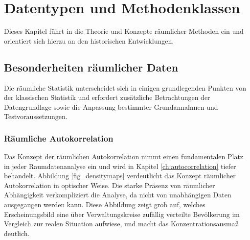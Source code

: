 \chapter{Datentypen und Methodenklassen}
\label{ch:classification}
Dieses Kapitel führt in die Theorie und Konzepte räumlicher Methoden ein und orientiert sich hierzu 
an den historischen Entwicklungen.



\section{Besonderheiten räumlicher Daten}

Die räumliche Statistik unterscheidet sich in einigen 
grundlegenden Punkten von der klassischen Statistik und erfordert zusätzliche 
Betrachtungen der Datengrundlage sowie die Anpassung bestimmter Grundannahmen und Testvoraussetzungen.


\subsection*{Räumliche Autokorrelation}
\label{subsec:tobler}

Das Konzept der räumlichen Autokorrelation nimmt einen fundamentalen Platz in jeder Raumdatenanalyse ein und wird in Kapitel \ref{ch:autocorrelation} tiefer behandelt.
Abbildung \ref{fig_densitymaps} verdeutlicht das Konzept räumlicher Autokorrelation in optischer Weise. 
Die starke Präsenz von räumlicher 
Abhängigkeit verkompliziert die Analyse, da nicht von unabhängigen Daten ausgegangen werden kann. 
Diese Abbildung zeigt grob auf, welches Erscheinungsbild eine über Verwaltungskreise zufällig verteilte Bevölkerung 
im Vergleich zur realen Situation aufwiese, und macht das Konzentrationsausmaß deutlich. \\


